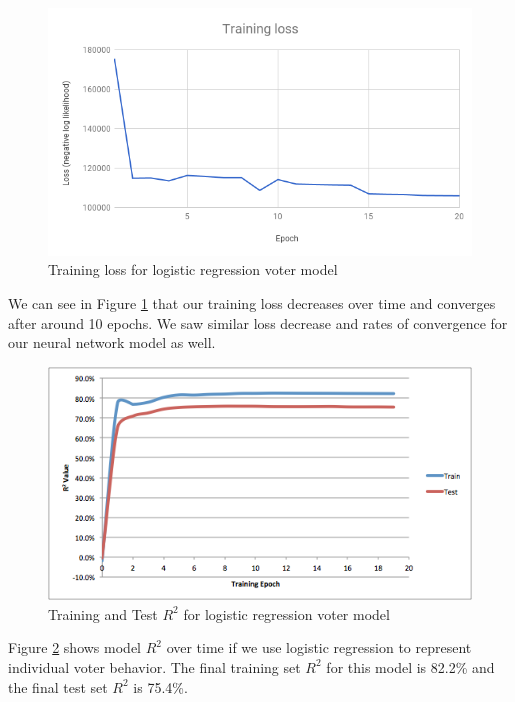 \documentclass[10pt,twocolumn,letterpaper]{article}
\begin{document}
\begin{figure}[H]
\begin{center}
\includegraphics[scale=0.35]{training-loss}
\end{center}
\caption{Training loss for logistic regression voter model}
\label{fig:training-loss}
\end{figure}

We can see in Figure \ref{fig:training-loss} that our training loss decreases over time and converges after around 10 epochs. We saw similar loss decrease and rates of convergence for our neural network model as well.

\begin{figure}[H]
\begin{center}
\includegraphics[scale=0.35]{holdout-R2}
\end{center}
\caption{Training and Test $R^2$ for logistic regression voter model}
\label{fig:holdout-R2}
\end{figure}

Figure \ref{fig:holdout-R2} shows model $R^2$ over time if we use logistic regression to represent individual voter behavior. The final training set $R^2$ for this model is 82.2\% and the final test set $R^2$ is 75.4\%.
\end{document}
